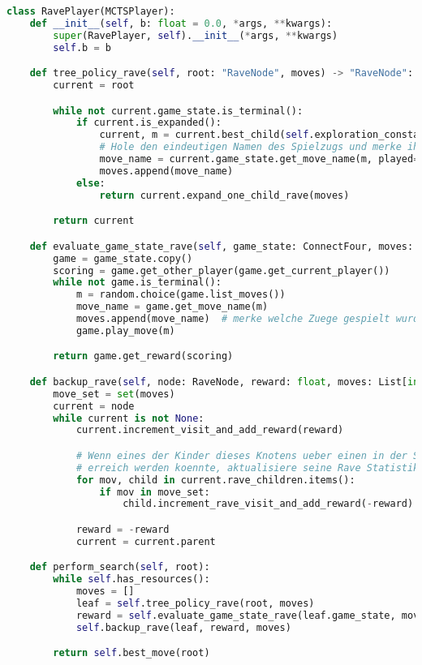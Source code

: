 \begin{lstlisting}[language=Python,label={lst:raveplayer}]
class RavePlayer(MCTSPlayer):
    def __init__(self, b: float = 0.0, *args, **kwargs):
        super(RavePlayer, self).__init__(*args, **kwargs)
        self.b = b

    def tree_policy_rave(self, root: "RaveNode", moves) -> "RaveNode":
        current = root

        while not current.game_state.is_terminal():
            if current.is_expanded():
                current, m = current.best_child(self.exploration_constant, b=self.b)
                # Hole den eindeutigen Namen des Spielzugs und merke ihn
                move_name = current.game_state.get_move_name(m, played=True)
                moves.append(move_name)
            else:
                return current.expand_one_child_rave(moves)

        return current

    def evaluate_game_state_rave(self, game_state: ConnectFour, moves: List[int]) -> float:
        game = game_state.copy()
        scoring = game.get_other_player(game.get_current_player())
        while not game.is_terminal():
            m = random.choice(game.list_moves())
            move_name = game.get_move_name(m)
            moves.append(move_name)  # merke welche Zuege gespielt wurden
            game.play_move(m)

        return game.get_reward(scoring)

    def backup_rave(self, node: RaveNode, reward: float, moves: List[int]):
        move_set = set(moves)
        current = node
        while current is not None:
            current.increment_visit_and_add_reward(reward)

            # Wenn eines der Kinder dieses Knotens ueber einen in der Simulation gemachten Spielzug
            # erreich werden koennte, aktualisiere seine Rave Statistik
            for mov, child in current.rave_children.items():
                if mov in move_set:
                    child.increment_rave_visit_and_add_reward(-reward)

            reward = -reward
            current = current.parent

    def perform_search(self, root):
        while self.has_resources():
            moves = []
            leaf = self.tree_policy_rave(root, moves)
            reward = self.evaluate_game_state_rave(leaf.game_state, moves)
            self.backup_rave(leaf, reward, moves)

        return self.best_move(root)
\end{lstlisting}

